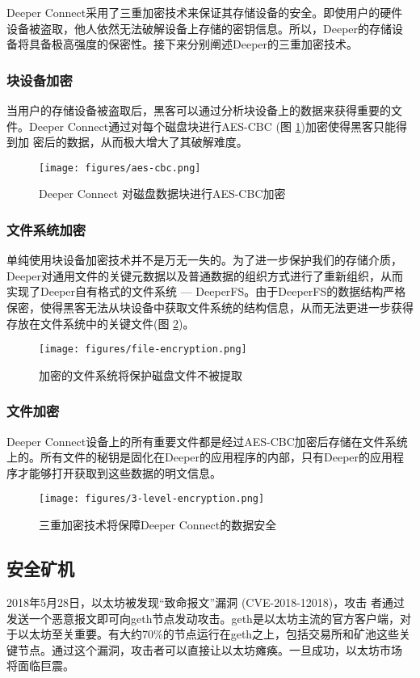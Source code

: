 \documentclass[a4paper]{article}
\begin{document}
Deeper Connect采用了三重加密技术来保证其存储设备的安全。即使用户的硬件设备被盗取，他人依然无法破解设备上存储的密钥信息。所以，Deeper的存储设备将具备极高强度的保密性。接下来分别阐述Deeper的三重加密技术。

\subsubsection{块设备加密}
当用户的存储设备被盗取后，黑客可以通过分析块设备上的数据来获得重要的文件。Deeper Connect通过对每个磁盘块进行AES-CBC \cite{frankel2003aes} (图 \ref{fig:aes-cbc})加密使得黑客只能得到加
密后的数据，从而极大增大了其破解难度。

\begin{figure}[hhhh]
\centering
\texttt{[image: figures/aes-cbc.png]}
\caption{Deeper Connect 对磁盘数据块进行AES-CBC加密}
\label{fig:aes-cbc}
\end{figure}

\subsubsection{文件系统加密}
单纯使用块设备加密技术并不是万无一失的。为了进一步保护我们的存储介质，Deeper对通用文件的关键元数据以及普通数据的组织方式进行了重新组织，从而实现了Deeper自有格式的文件系统 --- DeeperFS。由于DeeperFS的数据结构严格保密，使得黑客无法从块设备中获取文件系统的结构信息，从而无法更进一步获得存放在文件系统中的关键文件(图 \ref{fig:file-encryption})。

\begin{figure}[hhhh]
\centering
\texttt{[image: figures/file-encryption.png]}
\caption{加密的文件系统将保护磁盘文件不被提取}
\label{fig:file-encryption}
\end{figure}

\subsubsection{文件加密}
Deeper Connect设备上的所有重要文件都是经过AES-CBC加密后存储在文件系统上的。所有文件的秘钥是固化在Deeper的应用程序的内部，只有Deeper的应用程序才能够打开获取到这些数据的明文信息。

\begin{figure}[hhhh]
\centering
\texttt{[image: figures/3-level-encryption.png]}
\caption{三重加密技术将保障Deeper Connect的数据安全}
\label{fig:3-level-encryption}
\end{figure}

\subsection{安全矿机}
2018年5月28日，以太坊被发现“致命报文”漏洞 (CVE-2018-12018)\cite{ethereum-bug}，攻击
者通过发送一个恶意报文即可向geth节点发动攻击。geth是以太坊主流的官方客户端，对于以太坊至关重要。有大约70\%的节点运行在geth之上，包括交易所和矿池这些关键节点。通过这个漏洞，攻击者可以直接让以太坊瘫痪。一旦成功，以太坊市场
将面临巨震。
\end{document}
